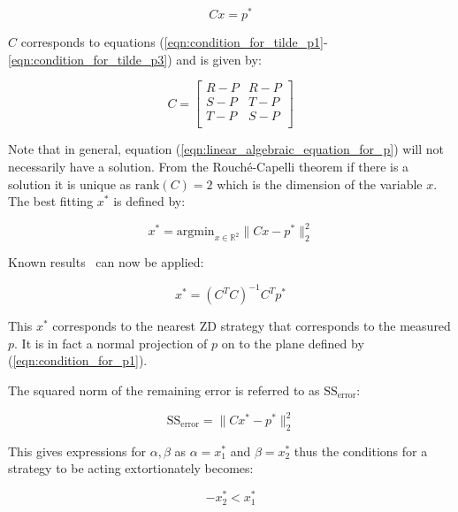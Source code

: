 \documentclass[a4paper]{article}
\begin{document}
\begin{equation}\label{eqn:linear_algebraic_equation_for_p}
    Cx= p^*
\end{equation}

\(C\) corresponds to equations
(\ref{eqn:condition_for_tilde_p1}-\ref{eqn:condition_for_tilde_p3}) and is
given by:

\begin{equation}\label{eqn:definition_of_C}
    C =
    \begin{bmatrix}
        R - P & R- P \\
        S - P & T- P \\
        T - P & S- P \\
    \end{bmatrix}
\end{equation}

Note that in general, equation (\ref{eqn:linear_algebraic_equation_for_p}) will
not necessarily have a solution. From the Rouch\'{e}-Capelli theorem if there is
a solution it is unique as \(\text{rank}(C)=2\) which is the dimension of the
variable \(x\). The best fitting \(x^*\) is defined by:

\begin{equation}\label{eqn:x_star}
    x^* = \text{argmin}_{x\in\mathbb{R}^2}\|C x- p^*\|_2^2
\end{equation}

Known results~\cite{kutner2004applied, rao1973linear, wakefield2013bayesian} can
now be applied:

\begin{equation}\label{eqn:x_star_formula}
    x^* = \left(C^TC\right)^{-1}C^Tp^*
\end{equation}

This \(x^*\) corresponds to the nearest ZD strategy that corresponds to the
measured \(p\). It is in fact a normal projection of \(p\) on to the plane
defined by (\ref{eqn:condition_for_p1}).

The squared norm of the remaining error is referred to as
\(\text{SS}_{\text{error}}\):

\begin{equation}\label{eqn:r_squared}
    \text{SS}_{\text{error}} = \|C x^*- p^*\|_2^2
\end{equation}

This gives expressions for \(\alpha, \beta\) as \(\alpha=x^*_1\) and
\(\beta=x^*_2\) thus the conditions for a strategy to be acting extortionately
becomes:

\begin{equation}
    -x^*_2 < x^*_1 \label{eqn:measured_condition_for_chi}
\end{equation}
\end{document}
